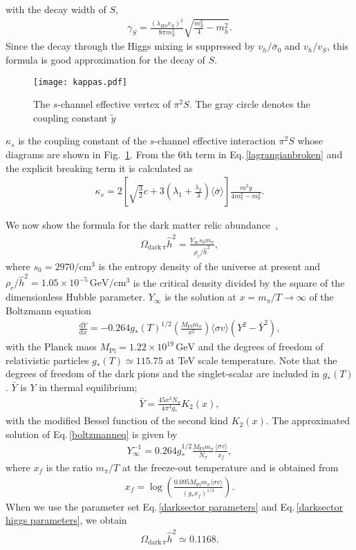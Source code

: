 \documentclass[a4paper,preprint,superscriptaddress,preprintnumbers,nofootinbib]{revtex4}
\newcommand{\al}[1]{\begin{align}#1\end{align}}
\newcommand{\df}{\text{d}}
\newcommand{\fn}[1]{\!\left(#1\right)}
\newcommand{\bra}{\langle}
\newcommand{\ket}{\rangle}
\begin{document}
with the decay width of $S$,
\al{
\gamma_S=\frac{(\lambda_{HS}v_S)^2}{8\pi m_S^2}\sqrt{\frac{m_S^2}{4}-m_h^2}.
}
Since the decay through the Higgs mixing is suppressed by $v_h/\bar{\sigma}_0$ and $v_h/v_S$, 
this formula is good approximation for the decay of $S$. 
\begin{figure}
\begin{center}
\texttt{[image: kappas.pdf]}
\end{center}
\caption{The $s$-channel effective vertex of $\pi^2S$. The gray circle denotes the coupling constant ${\tilde y}$}
\label{s channel vertex}
\end{figure}
$\kappa_s$ is the coupling constant of the $s$-channel effective interaction $\pi^2S$ whose diagrams are shown in Fig.~\ref{s channel vertex}.
From the 6th term in Eq.\,\eqref{lagrangianbroken} and the explicit breaking term it is calculated as
\al{
\kappa_s=2\left[\sqrt{\frac{3}{2}}c
+3\left(\lambda_1+\frac{\lambda_2}{3}\right)\bra \bar\sigma \ket
\right]\frac{m^2y}{4m_\pi^2-m_\sigma^2}.
}
\label{kappas}

We now show the formula for the dark matter relic abundance~\cite{Griest:1988ma},
\al{
\Omega_{\text{dark}\,\pi }{\hat h}^2 =\frac{Y_\infty s_0 m_\pi}{\rho_c/{\hat h}^2},
\label{relic}
}
where $s_0=2970/\text{cm}^3$ is the entropy density of the universe at present and $\rho_c/{\hat h}^2=1.05\times 10^{-5}\, \text{GeV}/\text{cm}^3$ is the critical density divided by the square of the dimensionless Hubble parameter.
$Y_\infty$ is the solution at $x=m_\pi/T\to\infty$ of the Boltzmann equation 
\al{
\frac{\df Y}{\df x}=-0.264g_*\fn{T}^{1/2}\left(\frac{M_\text{Pl}m_\pi}{x^2}\right)\bra \sigma v\ket (Y^2-\bar Y^2),
\label{boltzmanneq}
}
with the Planck mass $M_\text{Pl}=1.22\times 10^{19}\, \text{GeV}$ and the degrees of freedom of relativistic particles $g_*\fn{T}\simeq 115.75$ at TeV scale temperature.
Note that the degrees of freedom of the dark pions and the singlet-scalar are included in $g_*\fn{T}$.
$\bar Y$ is $Y$ in thermal equilibrium;
\al{
{\bar Y}=\frac{45 x^2N_\pi}{4\pi^4g_*}K_2\fn{x},
\label{themaltequiY}
}
with the modified Bessel function of the second kind $K_2\fn{x}$.
The approximated solution of Eq.\,\eqref{boltzmanneq} is given by
\al{
Y_\infty^{-1}=0.264g_*^{1/2}\frac{M_\text{Pl}m_\pi}{N_\pi}\frac{\bra \sigma v\ket }{x_f},
}
where $x_f$ is the ratio $m_\pi/T$ at the freeze-out temperature and is obtained from~\cite{Griest:1988ma}
\al{
x_f=\log \fn{\frac{0.095M_\text{Pl}m_\pi\bra  \sigma v\ket }{(g_*x_f)^{1/2}}}.
}
When we use the parameter set Eq.\,\eqref{darksector parameters} and Eq.\,\eqref{darksector higgs parameters}, we obtain
\al{ 
\Omega_{\text{dark}\, \pi}{\hat h}^2\simeq 0.1168.
\label{cosmologicalvalues}
}
\end{document}
